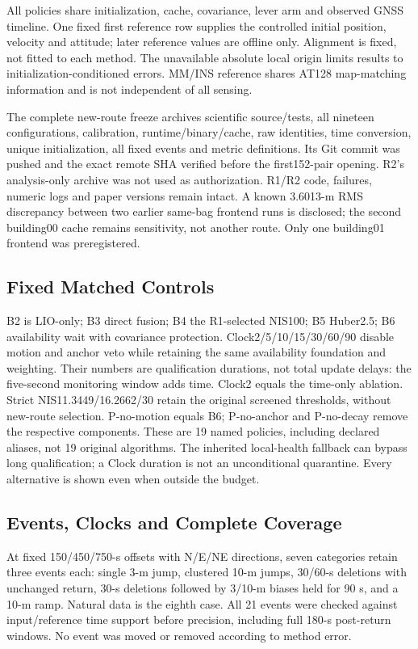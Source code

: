 \documentclass[conference]{IEEEtran}
\begin{document}
All policies share initialization, cache, covariance, lever arm and observed GNSS timeline. One fixed first reference row supplies the controlled initial position, velocity and attitude; later reference values are offline only. Alignment is fixed, not fitted to each method. The unavailable absolute local origin limits results to initialization-conditioned errors. MM/INS reference shares AT128 map-matching information and is not independent of all sensing.

The complete new-route freeze archives scientific source/tests, all nineteen configurations, calibration, runtime/binary/cache, raw identities, time conversion, unique initialization, all fixed events and metric definitions. Its Git commit was pushed and the exact remote SHA verified before the first152-pair opening. R2's analysis-only archive was not used as authorization. R1/R2 code, failures, numeric logs and paper versions remain intact. A known 3.6013-m RMS discrepancy between two earlier same-bag frontend runs is disclosed; the second building00 cache remains sensitivity, not another route. Only one building01 frontend was preregistered.

\subsection{Fixed Matched Controls}
B2 is LIO-only; B3 direct fusion; B4 the R1-selected NIS100; B5 Huber2.5; B6 availability wait with covariance protection. Clock2/5/10/15/30/60/90 disable motion and anchor veto while retaining the same availability foundation and weighting. Their numbers are qualification durations, not total update delays: the five-second monitoring window adds time. Clock2 equals the time-only ablation. Strict NIS11.3449/16.2662/30 retain the original screened thresholds, without new-route selection. P-no-motion equals B6; P-no-anchor and P-no-decay remove the respective components. These are 19 named policies, including declared aliases, not 19 original algorithms. The inherited local-health fallback can bypass long qualification; a Clock duration is not an unconditional quarantine. Every alternative is shown even when outside the budget.

\subsection{Events, Clocks and Complete Coverage}
At fixed 150/450/750-s offsets with N/E/NE directions, seven categories retain three events each: single 3-m jump, clustered 10-m jumps, 30/60-s deletions with unchanged return, 30-s deletions followed by 3/10-m biases held for 90 s, and a 10-m ramp. Natural data is the eighth case. All 21 events were checked against input/reference time support before precision, including full 180-s post-return windows. No event was moved or removed according to method error.
\end{document}
